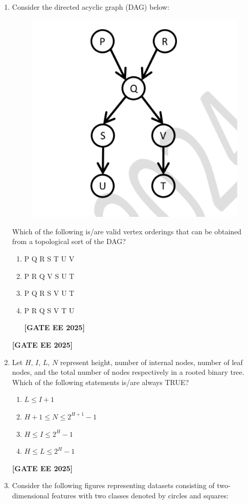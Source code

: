 \documentclass[journal]{IEEEtran}
\newcommand{\qfooter}{%
  \begin{flushright}\footnotesize\textbf{[GATE EE 2025]}\end{flushright}\vspace{1em}%
}
\begin{document}
\begin{enumerate}[leftmargin=*,label=\arabic*.]
\item Consider the directed acyclic graph (DAG) below:

\begin{figure}[h]
\centering
\includegraphics[width=0.55\columnwidth]{figs/51.png}
\end{figure}

Which of the following is/are valid vertex orderings that can be obtained from a topological sort of the DAG?
\begin{enumerate}
\item P Q R S T U V
\item P R Q V S U T
\item P Q R S V U T
\item P R Q S V T U
\qfooter
\end{enumerate} \qfooter
\item Let $H,\,I,\,L,\,N$ represent height, number of internal nodes, number of leaf nodes, and the total number of nodes respectively in a rooted binary tree. Which of the following statements is/are always TRUE?
\begin{multicols}{2}
\begin{enumerate}[label=(\Alph*)]
\item $L\leq I+1$
\item $H+1 \leq N \leq 2^{H+1}-1$
\item $H\leq I\leq 2^{H}-1$
\item $H\leq L\leq 2^{H}-1$
\end{enumerate} \qfooter
\end{multicols}

\item Consider the following figures representing datasets consisting of two-dimensional features with two classes denoted by circles and squares:


\end{enumerate}
\end{document}
